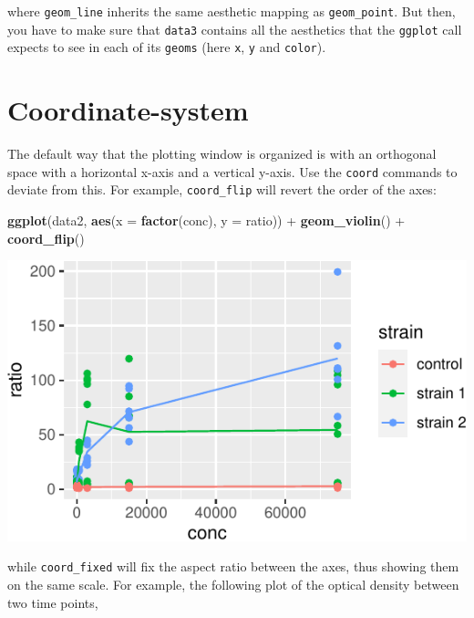 \documentclass[]{book}
\newenvironment{Shaded}{}{}
\newcommand{\DataTypeTok}[1]{\textcolor[rgb]{0.56,0.13,0.00}{#1}}
\newcommand{\KeywordTok}[1]{\textcolor[rgb]{0.00,0.44,0.13}{\textbf{#1}}}
\newcommand{\NormalTok}[1]{#1}
\newcommand{\OperatorTok}[1]{\textcolor[rgb]{0.40,0.40,0.40}{#1}}
\newcommand{\StringTok}[1]{\textcolor[rgb]{0.25,0.44,0.63}{#1}}
\begin{document}
where \texttt{geom\_line} inherits the same aesthetic mapping as \texttt{geom\_point}. But then, you have to make sure that \texttt{data3} contains all the aesthetics that the \texttt{ggplot} call expects to see in each of its \texttt{geoms} (here \texttt{x}, \texttt{y} and \texttt{color}).

\hypertarget{coordinate-system}{%
\section{Coordinate-system}\label{coordinate-system}}

The default way that the plotting window is organized is with an orthogonal space with a horizontal x-axis and a vertical y-axis. Use the \texttt{coord} commands to deviate from this. For example, \texttt{coord\_flip} will revert the order of the axes:

\begin{Shaded}
\begin{Highlighting}[]
\KeywordTok{ggplot}\NormalTok{(data2, }\KeywordTok{aes}\NormalTok{(}\DataTypeTok{x =} \KeywordTok{factor}\NormalTok{(conc), }\DataTypeTok{y =}\NormalTok{ ratio)) }\OperatorTok{+}\StringTok{ }
\StringTok{  }\KeywordTok{geom_violin}\NormalTok{() }\OperatorTok{+}
\StringTok{  }\KeywordTok{coord_flip}\NormalTok{()}
\end{Highlighting}
\end{Shaded}

\begin{center}\includegraphics[width=\textwidth]{TRES-Tidy-Tutorial_files/figure-latex/unnamed-chunk-127-1} \end{center}

while \texttt{coord\_fixed} will fix the aspect ratio between the axes, thus showing them on the same scale. For example, the following plot of the optical density between two time points,
\end{document}
